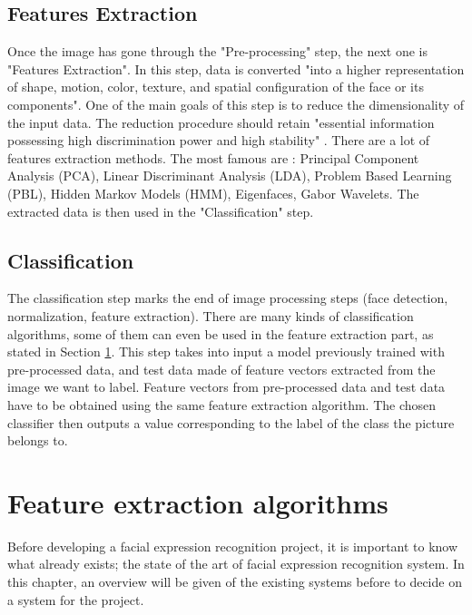 \subsection{Features Extraction}

\vspace{\baselineskip}
\noindent Once the image has gone through the "Pre-processing" step, the next one is "Features Extraction". In this step, data is converted "into a higher representation of shape, motion, color, texture, and spatial configuration of the face or its components". One of the main goals of this step is to reduce the dimensionality of the input data. The reduction procedure should retain "essential information possessing high discrimination power and high stability" \cite{CHI03}. There are a lot of features extraction methods. The most famous are : Principal Component Analysis (PCA), Linear Discriminant Analysis (LDA), Problem Based Learning (PBL), Hidden Markov Models (HMM), Eigenfaces, Gabor Wavelets. The extracted data is then used in the "Classification" step.
\newline

\subsection{Classification}

\noindent The classification step marks the end of image processing steps (face detection, normalization, feature extraction). There are many kinds of classification algorithms, some of them can even be used in the feature extraction part, as stated in Section \ref{feat_x}. This step takes into input a model previously trained with pre-processed data, and test data made of feature vectors extracted from the image we want to label. Feature vectors from pre-processed data and test data have to be obtained using the same feature extraction algorithm. The chosen classifier then outputs a value corresponding to the label of the class the picture belongs to.
\vspace{\baselineskip}

\section{Feature extraction algorithms} \label{feat_x}

\vspace{\baselineskip}
\noindent Before developing a facial expression recognition project, it is important to know what already exists; the state of the art of facial expression recognition system. In this chapter, an overview will be given of the existing systems before to decide on a system for the project.
\newline

